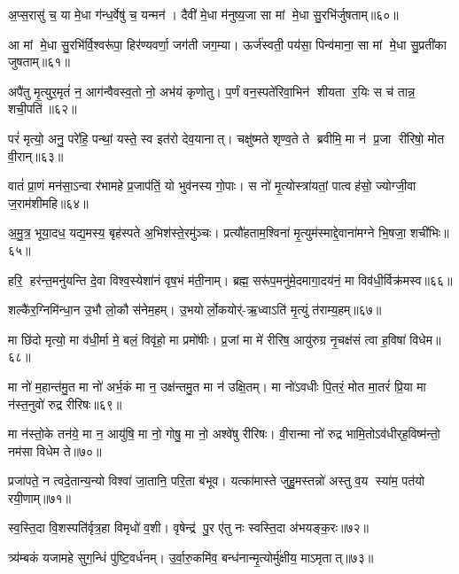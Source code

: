 अ॒प्स॒रासु॑ च॒ या मे॒धा ग॑न्ध॒र्वेषु॑ च॒ यन्मन॑। दैवी॑ मे॒धा म॑नुष्य॒जा सा मां मे॒धा सु॒रभि॑र्जुषताम्॥६०॥
\anuvakamend


आ मां मे॒धा सु॒रभि॑र्वि॒श्वरू॑पा॒ हिर॑ण्यवर्णा॒ जग॑ती जग॒म्या। ऊर्ज॑स्वती॒ पय॑सा॒ पिन्व॑माना॒ सा मां मे॒धा सु॒प्रती॑का जुषताम्॥६१॥\anuvakamend


अपै॑तु मृ॒त्युर॒मृतं॑ न॒ आग॑न्वैवस्व॒तो नो॒ अभ॑यं कृणोतु। प॒र्णं वन॒स्पते॑रिवा॒भिन॑ शीयता र॒यिः स च॑ तान्न॒ शची॒पति॑॥६२॥%
\anuvakamend

 परं॑ मृत्यो॒ अनु॒ परे॑हि॒ पन्थां॒ यस्ते॒ स्व इत॑रो देव॒यानात्। चक्षु॑ष्मते शृण्व॒ते ते ब्रवीमि॒ मा न॑ प्र॒जा री॑रिषो॒ मोत वी॒रान्॥६३॥
 \anuvakamend
 
 वातं॑ प्रा॒णं मन॑सा॒ऽन्वा र॑भामहे प्र॒जाप॑तिं॒ यो भुव॑नस्य गो॒पाः। स नो॑ मृ॒त्योस्त्रा॑यतां॒ पात्वह॑सो॒ ज्योग्जी॒वा ज॒राम॑शीमहि॥६४॥
 \anuvakamend
 
 अ॒मु॒त्र॒ भूया॒दध॒ यद्य॒मस्य॒ बृह॑स्पते अ॒भिश॑स्ते॒रमु॑ञ्चः। प्रत्यौ॑हताम॒श्विना॑ मृ॒त्युम॑स्माद्दे॒वाना॑मग्ने भि॒षजा॒ शची॑भिः॥६५॥
 \anuvakamend
 
 हरि॒ हर॑न्त॒मनु॑यन्ति दे॒वा विश्व॒स्येशा॑नं वृष॒भं म॑ती॒नाम्। ब्रह्म॒ सरू॑प॒मनु॑मे॒दमागा॒दय॑नं॒ मा विव॑धी॒र्विक्र॑मस्व॥६६॥
 \anuvakamend
 
 शल्कै॑र॒ग्निमि॑न्धा॒न उ॒भौ लो॒कौ स॑नेम॒हम्। उ॒भयोर्लो॒कयोर्॑-ऋ॒ध्वाऽति॑ मृ॒त्युं त॑राम्य॒हम्॥६७॥
\anuvakamend
 
मा छि॑दो मृत्यो॒ मा व॑धी॒र्मा मे॒ बलं॒ विवृ॑हो॒ मा प्रमो॑षीः। प्र॒जां मा मे॑ रीरिष॒ आयु॑रुग्र नृ॒चक्ष॑सं त्वा ह॒विषा॑ विधेम॥६८॥
\anuvakamend
 
मा नो॑ म॒हान्त॑मु॒त मा नो॑ अर्भ॒कं मा न॒ उक्ष॑न्तमु॒त मा न॑ उक्षि॒तम्। मा नो॑ऽवधीः पि॒तरं॒ मोत मा॒तरं॑ प्रि॒या मा न॑स्त॒नुवो॑ रुद्र रीरिषः॥६९॥
\anuvakamend

मा न॑स्तो॒के तन॑ये॒ मा न॒ आयु॑षि॒ मा नो॒ गोषु॒ मा नो॒ अश्वे॑षु रीरिषः। वी॒रान्मा नो॑ रुद्र भामि॒तोऽव॑धीर्‌ह॒विष्म॑न्तो॒ नम॑सा विधेम ते॥७०॥
\anuvakamend 

प्रजा॑पते॒ न त्वदे॒तान्य॒न्यो विश्वा॑ जा॒तानि॒ परि॒ता ब॑भूव। यत्का॑मास्ते जुहु॒मस्तन्नो॑ अस्तु व॒य स्या॑म॒ पत॑यो रयी॒णाम्॥७१॥
\anuvakamend 

स्व॒स्ति॒दा वि॒शस्पति॑र्वृत्र॒हा विमृधो॑ व॒शी। वृषेन्द्र॑ पु॒र ए॑तु नः स्वस्ति॒दा अ॑भयङ्क॒रः॥७२॥
\anuvakamend 

त्र्य॑म्बकं यजामहे सुग॒न्धिं पु॑ष्टि॒वर्ध॑नम्। उ॒र्वा॒रु॒कमि॑व॒ बन्ध॑नान्मृ॒त्योर्मु॑क्षीय॒ माऽमृतात्॥७३॥
\anuvakamend 

